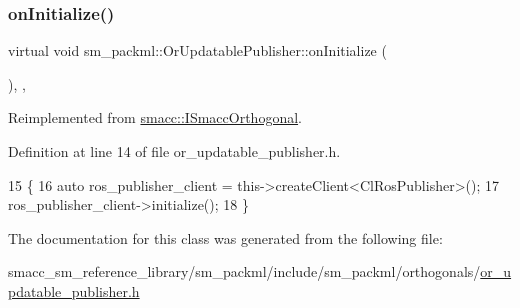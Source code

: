 \subsubsection{\texorpdfstring{on\+Initialize()}{onInitialize()}}
{\footnotesize\ttfamily virtual void sm\+\_\+packml\+::\+Or\+Updatable\+Publisher\+::on\+Initialize (\begin{DoxyParamCaption}{ }\end{DoxyParamCaption})\hspace{0.3cm}{\ttfamily [inline]}, {\ttfamily [override]}, {\ttfamily [virtual]}}



Reimplemented from \hyperlink{classsmacc_1_1ISmaccOrthogonal_a6bb31c620cb64dd7b8417f8705c79c7a}{smacc\+::\+I\+Smacc\+Orthogonal}.



Definition at line 14 of file or\+\_\+updatable\+\_\+publisher.\+h.


\begin{DoxyCode}
15     \{
16         \textcolor{keyword}{auto} ros\_publisher\_client = this->createClient<ClRosPublisher>();
17         ros\_publisher\_client->initialize();
18     \}
\end{DoxyCode}


The documentation for this class was generated from the following file\+:\begin{DoxyCompactItemize}
\item 
smacc\+\_\+sm\+\_\+reference\+\_\+library/sm\+\_\+packml/include/sm\+\_\+packml/orthogonals/\hyperlink{sm__packml_2include_2sm__packml_2orthogonals_2or__updatable__publisher_8h}{or\+\_\+updatable\+\_\+publisher.\+h}\end{DoxyCompactItemize}
